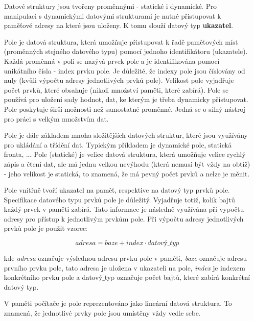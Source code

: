 Datové struktury jsou tvořeny proměnnými - statické i dynamické. Pro manipulaci s dynamickými datovými strukturami je nutné přistupovat k paměťové adresy na které jsou uloženy. K tomu slouží datový typ {\bf ukazatel}.


Pole je datová struktura, která umožňuje přistupovat k řadě paměťových míst (proměnných stejného datového typu) pomocí jednoho identifikátoru (ukazatele). Každá proměnná v poli se nazývá prvek pole a je identifikována pomocí unikátního čísla - index prvku pole. Je důležité, že indexy pole jsou číslovány od nuly (kvůli výpočtu adresy jednotlivých prvků pole). Velikost pole vyjadřuje počet prvků, které obsahuje (nikoli množství paměti, které zabírá). Pole se používá pro uložení sady hodnot, dat, ke kterým je třeba dynamicky přistupovat. Pole poskytuje širší možnosti než samostatné proměnné. Jedná se o silný nástroj pro práci s velkým množstvím dat. 

Pole je dále základem mnoha složitějších datových struktur, které jsou využívány pro ukládání a třídění dat. Typickým příkladem je dynamické pole, statická fronta, ... Pole (statické) je velice datová struktura, která umožňuje velice rychlý zápis a čtení dat, ale má jednu velkou nevýhodu (která nemusí být vždy na obtíž) - jeho velikost je statická, to znamená, že má pevný počet prvků a nelze je měnit. 


Pole vnitřně tvoří ukazatel na paměť, respektive na datový typ prvků pole. Specifikace datového typu prvků pole je důležitý. Vyjadřuje totiž, kolik bajtů každý prvek v paměti zabírá. Tato informace je následně využívána při vypočtu adresy pro přístup k jednotlivým prvkům pole. Při výpočtu adresy jednotlivých prvků pole je použit vzorec:

$$ adresa = baze + index \cdot datový\_typ $$

kde {\it adresa} označuje výslednou adresu prvku pole v paměti, {\it baze} označuje adresu prvního prvku pole, tato adresa je uložena v ukazateli na pole, {\it index} je indexem konkrétního prvku pole a datový$\_$typ označuje počet bajtů, které zabírá konkrétní datový typ.

V paměti počítače je pole reprezentováno jako lineární datová struktura. To znamená, že jednotlivé prvky pole jsou umístěny vždy vedle sebe. 

\centerline{}



